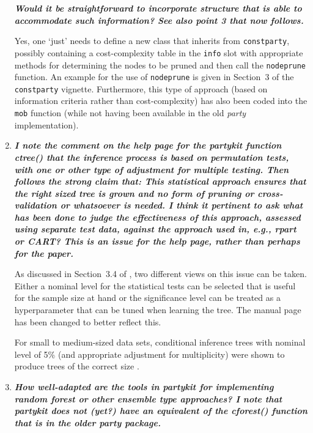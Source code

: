 \documentclass{article}
\begin{document}
\begin{enumerate}
\medskip

\textbf{\textit{%
Would it be straightforward to incorporate structure that is able to
accommodate such information?  See also point 3 that now follows.
}}

\smallskip

Yes, one `just' needs to define a new class that inherits from \texttt{constparty},
possibly containing a cost-complexity table in the \texttt{info} slot with
appropriate methods for determining the nodes to be pruned and then call
the \texttt{nodeprune} function. An example for the use of \texttt{nodeprune} is
given in Section~3 of the \texttt{constparty} vignette. Furthermore,
this type of approach (based on information criteria rather than cost-complexity)
has also been coded into the \texttt{mob} function (while not having been available
in the old \emph{party} implementation).

\item 
\textbf{\textit{%
I note the comment on the help page for the partykit function ctree() that
the inference process is based on permutation tests, with one or other type
of adjustment for multiple testing.  Then follows the strong claim that:
This statistical approach ensures that the right sized tree is grown and no
form of pruning or cross-validation or whatsoever is needed.  I think it
pertinent to ask what has been done to judge the effectiveness of this
approach, assessed using separate test data, against the approach used in,
e.g., rpart or CART?  This is an issue for the help page, rather than
perhaps for the paper.
}}

\smallskip
As discussed in Section~3.4 of \cite{Hothorn+Hornik+Zeileis:2006}, two
different views on this issue can be taken. Either a nominal level for
the statistical tests can be selected that is useful for the sample size
at hand or the significance level can be treated as a hyperparameter that
can be tuned when learning the tree. The manual page has been changed
to better reflect this.

For small to medium-sized data sets, conditional inference trees with
nominal level of 5\% (and appropriate adjustment for multiplicity) were
shown to produce trees of the correct size \citep[simulation results
in][]{Hothorn+Hornik+Zeileis:2006}.

\item 
\textbf{\textit{%
How well-adapted are the tools in partykit for implementing random forest
or other ensemble type approaches? I note that partykit does not (yet?) have
an equivalent of the cforest() function that is in the older party package.
}}


\end{enumerate}
\end{document}
